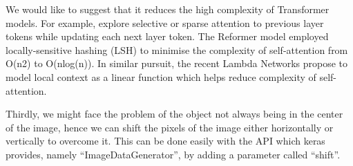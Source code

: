 We would like to suggest that it reduces the high complexity of Transformer models. For example, explore selective or sparse attention to previous layer tokens while updating each next layer token. The Reformer model employed locally-sensitive hashing (LSH) to minimise the complexity of self-attention from O(n2) to O(nlog(n)). In similar pursuit, the recent Lambda Networks propose to model local context as a linear function which helps reduce complexity of self-attention.

Thirdly, we might face the problem of the object not always being in the center of the image, hence we can shift the pixels of the image either horizontally or vertically to overcome it. This can be done easily with the API which keras provides, namely “ImageDataGenerator”, by adding a parameter called “shift”. 
